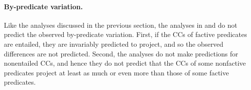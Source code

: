\documentclass[a4paper,12pt,twoside]{article}
\begin{document}



		\paragraph{By-predicate variation.} Like the analyses discussed in the previous section, the analyses in \citealt{abrusan_predicting_2011,abrusan_presupposition_2016} and \citealt{simons_best_2017} do not predict the observed by-predicate variation. First, if the CCs of factive predicates are entailed, they are invariably predicted to project, and so the observed differences are not predicted.  Second, the analyses do not make predictions for nonentailed CCs, and hence they do not predict that the CCs of some nonfactive predicates project at least as much or even more than those of some factive predicates. 
  
\end{document}
